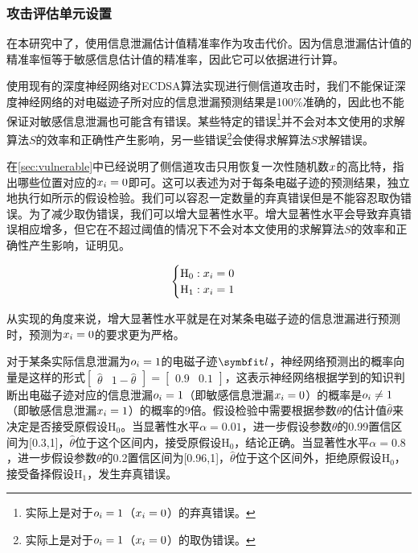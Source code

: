 {	\subsubsection{攻击评估单元设置}\label{subss:ecdsaevaluation}
	在本研究中了，使用信息泄漏估计值精准率作为攻击代价。因为信息泄漏估计值的精准率恒等于敏感信息估计值的精准率，因此它可以依据进行计算。
	
	使用现有的深度神经网络对ECDSA算法实现进行侧信道攻击时，我们不能保证深度神经网络的对电磁迹子所对应的信息泄漏预测结果是100\%准确的，因此也不能保证对敏感信息泄漏也可能含有错误。某些特定的错误\footnote{实际上是对于$o_i=1$（$x_i=0$）的弃真错误。}并不会对本文使用的求解算法$S$的效率和正确性产生影响，另一些错误\footnote{实际上是对于$o_i=1$（$x_i=0$）的取伪错误。}会使得求解算法$S$求解错误。
	
	在\ref{sec:vulnerable}中已经说明了侧信道攻击只用恢复一次性随机数$x$的高比特，指出哪些位置对应的$x_i=0$即可。这可以表述为对于每条电磁子迹的预测结果，独立地执行如所示的假设检验。我们可以容忍一定数量的弃真错误但是不能容忍取伪错误。为了减少取伪错误，我们可以增大显著性水平。增大显著性水平会导致弃真错误相应增多，但它在不超过阈值的情况下不会对本文使用的求解算法$S$的效率和正确性产生影响，证明见。
	
	\begin{equation}
		\begin{cases}
			\mathrm H_0:x_i=0\\
			\mathrm H_{1}:x_i=1
		\end{cases}
		\label{eq:determindewhich}
	\end{equation}
	
	从实现的角度来说，增大显著性水平就是在对某条电磁子迹的信息泄漏进行预测时，预测为$x_i=0$的要求更为严格。
	
	\begin{example}
		对于某条实际信息泄漏为$o_i=1$的电磁子迹$\Vector l$，神经网络预测出的概率向量是这样的形式$\begin{bmatrix}\hat\theta&1-\hat\theta\end{bmatrix}=\begin{bmatrix}0.9&0.1\end{bmatrix}$，这表示神经网络根据学到的知识判断出电磁子迹对应的信息泄漏$o_i=1$（即敏感信息泄漏$x_i=0$）的概率是$o_i\neq 1$（即敏感信息泄漏$x_i=1$）的概率的9倍。假设检验中需要根据参数$\theta$的估计值$\hat\theta$来决定是否接受原假设$\mathrm H_0$。当显著性水平$\alpha=0.01$，进一步假设参数$\theta$的0.99置信区间为[0.3,1]，$\hat\theta$位于这个区间内，接受原假设$\mathrm H_0$，结论正确。当显著性水平$\alpha=0.8$，进一步假设参数$\theta$的0.2置信区间为[0.96,1]，$\hat\theta$位于这个区间外，拒绝原假设$\mathrm H_0$，接受备择假设$\mathrm H_1$，发生弃真错误。
	\end{example}
	
}
